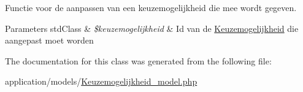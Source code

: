 Functie voor de aanpassen van een keuzemogelijkheid die mee wordt gegeven. 


\begin{DoxyParams}[1]{Parameters}
std\+Class & {\em \$keuzemogelijkheid} & Id van de \mbox{\hyperlink{class_keuzemogelijkheid}{Keuzemogelijkheid}} die aangepast moet worden \\
\hline
\end{DoxyParams}


The documentation for this class was generated from the following file\+:\begin{DoxyCompactItemize}
\item 
application/models/\mbox{\hyperlink{_keuzemogelijkheid__model_8php}{Keuzemogelijkheid\+\_\+model.\+php}}\end{DoxyCompactItemize}
